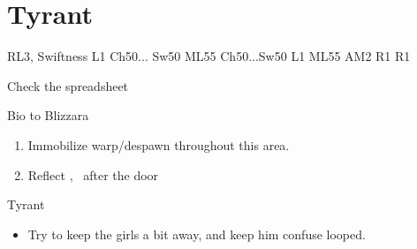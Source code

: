 \chapter{Tyrant}

\begin{liscense}
RL3, Swiftness					
L1					Ch50... Sw50
					ML55
				Ch50...Sw50	L1
				ML55	
AM2				R1	R1

Check the spreadsheet
\end{liscense}
\begin{gambit}
Bio to Blizzara
\end{gambit}
\begin{enumerate}
\item Immobilize warp/despawn throughout this area.
\item Reflect \ashe, \penelo\ after the door
\end{enumerate}
\begin{battle}{Tyrant}
\begin{itemize}
\penelof Dispel
\vaanf Once it's charged a bit, start spamming Confuse
\item Try to keep the girls a bit away, and keep him confuse looped.
\end{itemize}
\end{battle}